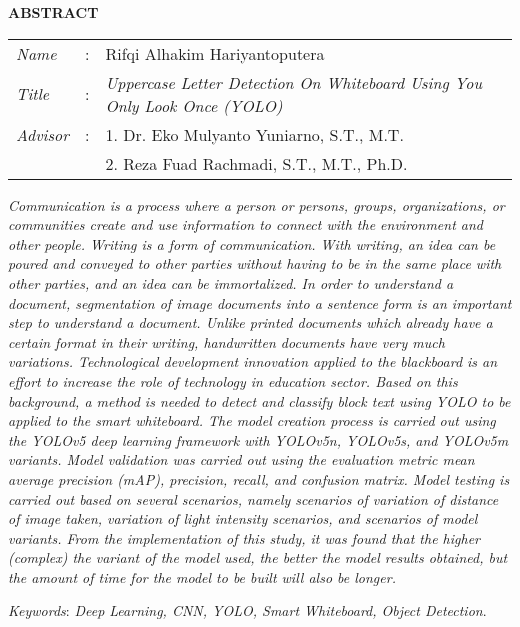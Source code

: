 \begin{center}
  \large\textbf{ABSTRACT}
\end{center}


\vspace{2ex}

\begingroup
  \setlength{\tabcolsep}{0pt}

  \noindent
  \begin{tabularx}{\textwidth}{l >{\centering}m{3em} X}
    \emph{Name}     &:& Rifqi Alhakim Hariyantoputera \\

    \emph{Title}    &:& \emph{Uppercase Letter Detection On Whiteboard Using You Only Look Once (YOLO)} \\

    \textit{Advisor}  &:& 1. Dr. Eko Mulyanto Yuniarno, S.T., M.T. \\
                      & & 2. Reza Fuad Rachmadi, S.T., M.T., Ph.D. \\
  \end{tabularx}
\endgroup

\textit{Communication is a process where a person or persons, groups, organizations, or communities create and use information to connect with the environment and other people. Writing is a form of communication. With writing, an idea can be poured and conveyed to other parties without having to be in the same place with other parties, and an idea can be immortalized. 
In order to understand a document, segmentation of image documents into a sentence form is an important step to understand a document. Unlike printed documents which already have a certain format in their writing, handwritten documents have very much variations. Technological development innovation applied to the blackboard is an effort to increase the role of technology in education sector. Based on this background, a method is needed to detect and classify block text using YOLO to be applied to the smart whiteboard. The model creation process is carried out using the YOLOv5 deep learning framework with YOLOv5n, YOLOv5s, and YOLOv5m variants. Model validation was carried out using the evaluation metric mean average precision (mAP), precision, recall, and confusion matrix. Model testing is carried out based on several scenarios, namely scenarios of variation of distance of image taken, variation of light intensity scenarios, and scenarios of model variants. From the implementation of this study, it was found that the higher (complex) the variant of the model used, the better the model results obtained, but the amount of time for the model to be built will also be longer.}

\textit{Keywords}: \textit{Deep Learning, CNN, YOLO, Smart Whiteboard, Object Detection}.
